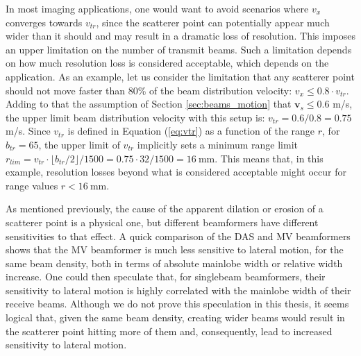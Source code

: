 In most imaging applications, one would want to avoid scenarios where $v_x$ converges towards $v_{tr}$, since the scatterer point can potentially appear much wider than it should and may result in a dramatic loss of resolution.
This imposes an upper limitation on the number of transmit beams. Such a limitation depends on how much resolution loss is considered acceptable, which depends on the application.
As an example, let us consider the limitation that any scatterer point should not move faster than 80\% of the beam distribution velocity: $v_x \leq 0.8 \cdot v_{tr}$.
Adding to that the assumption of Section \ref{sec:beams_motion} that $\boldsymbol{v}_s \leq 0.6$ m/s, the upper limit beam distribution velocity with this setup is: $v_{tr} = 0.6 / 0.8 = 0.75$ m/s. Since $v_{tr}$ is defined in Equation (\ref{eq:vtr}) as a function of the range $r$, for $b_{tr} = 65$, the upper limit of $v_{tr}$ implicitly sets a minimum range limit $r_{lim} = v_{tr} \cdot \lfloor b_{tr} / 2 \rfloor / 1500 = 0.75 \cdot 32 / 1500 = 16~$mm. This means that, in this example, resolution losses beyond what is considered acceptable might occur for range values $r < 16~$mm.

As mentioned previously, the cause of the apparent dilation or erosion of a scatterer point is a physical one, but different beamformers have different sensitivities to that effect. A quick comparison of the DAS and MV beamformers shows that the MV beamformer is much less sensitive to lateral motion, for the same beam density, both in terms of absolute mainlobe width or relative width increase. One could then speculate that, for singlebeam beamformers, their sensitivity to lateral motion is highly correlated with the mainlobe width of their receive beams.
Although we do not prove this speculation in this thesis, it seems logical that, given the same beam density, creating wider beams would result in the scatterer point hitting more of them and, consequently, lead to increased sensitivity to lateral motion.

